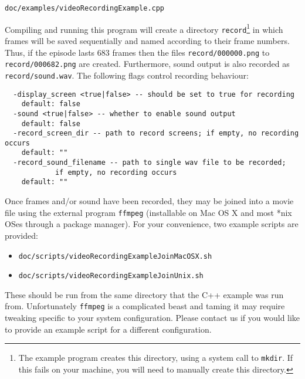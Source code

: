 \documentclass[12pt]{article}
\begin{document}
\begin{center}
\texttt{doc/examples/videoRecordingExample.cpp}
\end{center}

Compiling and running this program will create a directory \texttt{record}\footnote{The example program creates this directory, using a system call to \texttt{mkdir}. If this fails on your machine, you will need to manually create this directory.} in which frames will be saved sequentially and named according to their frame numbers. Thus, if the episode lasts 683 frames then the files \verb+record/000000.png+ to \verb+record/000682.png+ are created. Furthermore, sound output is also recorded as \verb+record/sound.wav+. The following flags control recording behaviour:

\small{
\begin{verbatim}
  -display_screen <true|false> -- should be set to true for recording
    default: false
  -sound <true|false> -- whether to enable sound output
    default: false
  -record_screen_dir -- path to record screens; if empty, no recording occurs
    default: ""
  -record_sound_filename -- path to single wav file to be recorded; 
            if empty, no recording occurs
    default: ""
\end{verbatim}
}

Once frames and/or sound have been recorded, they may be joined into a movie file using the external program \texttt{ffmpeg} (installable on Mac OS X and most *nix OSes through a package manager). For your convenience, two example scripts are provided:

\begin{itemize}
    \item{\texttt{doc/scripts/videoRecordingExampleJoinMacOSX.sh}}
    \item{\texttt{doc/scripts/videoRecordingExampleJoinUnix.sh}}
\end{itemize}

These should be run from the same directory that the C++ example was run from. Unfortunately \texttt{ffmpeg} is a complicated beast and taming it may require tweaking specific to your system configuration. Please contact us if you would like to provide an example script for a different configuration.
\end{document}
